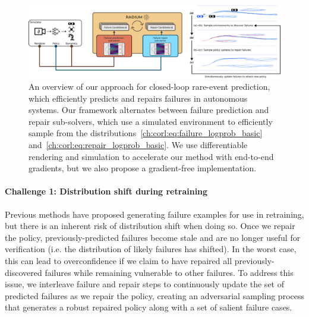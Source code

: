 \begin{figure}[tb]
    \centering
    \includegraphics[width=\linewidth]{images/corl/architecture.png}
    \caption{An overview of our approach for closed-loop rare-event prediction, which efficiently predicts and repairs failures in autonomous systems. Our framework alternates between failure prediction and repair sub-solvers, which use a simulated environment to efficiently sample from the distributions~\eqref{ch:corl:eq:failure_logprob_basic} and~\eqref{ch:corl:eq:repair_logprob_basic}. We use differentiable rendering and simulation to accelerate our method with end-to-end gradients, but we also propose a gradient-free implementation.}\label{ch:corl:fig:architecture}
\end{figure}

\paragraph{Challenge 1: Distribution shift during retraining} Previous methods have proposed generating failure examples for use in retraining, but there is an inherent risk of distribution shift when doing so. Once we repair the policy, previously-predicted failures become stale and are no longer useful for verification (i.e. the distribution of likely failures has shifted). In the worst case, this can lead to overconfidence if we claim to have repaired all previously-discovered failures while remaining vulnerable to other failures. To address this issue, we interleave failure and repair steps to continuously update the set of predicted failures as we repair the policy, creating an adversarial sampling process that generates a robust repaired policy along with a set of salient failure cases.

